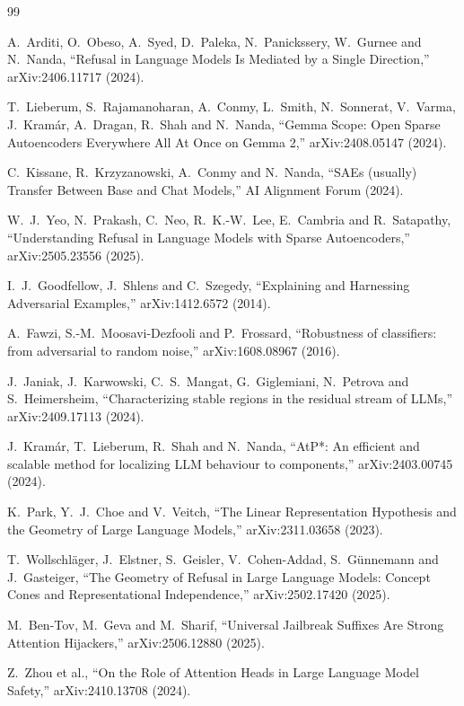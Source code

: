 \documentclass[11pt]{article}
\begin{document}
\begin{thebibliography}{99}

A.~Arditi, O.~Obeso, A.~Syed, D.~Paleka, N.~Panickssery, W.~Gurnee and N.~Nanda,
``Refusal in Language Models Is Mediated by a Single Direction,''
arXiv:2406.11717 (2024).

T.~Lieberum, S.~Rajamanoharan, A.~Conmy, L.~Smith, N.~Sonnerat, V.~Varma, J.~Kram\'ar, A.~Dragan, R.~Shah and N.~Nanda,
``Gemma Scope: Open Sparse Autoencoders Everywhere All At Once on Gemma 2,''
arXiv:2408.05147 (2024).

C.~Kissane, R.~Krzyzanowski, A.~Conmy and N.~Nanda,
``SAEs (usually) Transfer Between Base and Chat Models,''
AI Alignment Forum (2024).

W.~J.~Yeo, N.~Prakash, C.~Neo, R.~K.-W.~Lee, E.~Cambria and R.~Satapathy,
``Understanding Refusal in Language Models with Sparse Autoencoders,''
arXiv:2505.23556 (2025).

I.~J.~Goodfellow, J.~Shlens and C.~Szegedy,
``Explaining and Harnessing Adversarial Examples,''
arXiv:1412.6572 (2014).

A.~Fawzi, S.-M.~Moosavi-Dezfooli and P.~Frossard,
``Robustness of classifiers: from adversarial to random noise,''
arXiv:1608.08967 (2016).

J.~Janiak, J.~Karwowski, C.~S.~Mangat, G.~Giglemiani, N.~Petrova and S.~Heimersheim,
``Characterizing stable regions in the residual stream of LLMs,''
arXiv:2409.17113 (2024).

J.~Kram\'ar, T.~Lieberum, R.~Shah and N.~Nanda,
``AtP*: An efficient and scalable method for localizing LLM behaviour to components,''
arXiv:2403.00745 (2024).

K.~Park, Y.~J.~Choe and V.~Veitch,
``The Linear Representation Hypothesis and the Geometry of Large Language Models,''
arXiv:2311.03658 (2023).

T.~Wollschl\"ager, J.~Elstner, S.~Geisler, V.~Cohen-Addad, S.~G\"unnemann and J.~Gasteiger,
``The Geometry of Refusal in Large Language Models: Concept Cones and Representational Independence,''
arXiv:2502.17420 (2025).

M.~Ben-Tov, M.~Geva and M.~Sharif,
``Universal Jailbreak Suffixes Are Strong Attention Hijackers,''
arXiv:2506.12880 (2025).

Z.~Zhou et al.,
``On the Role of Attention Heads in Large Language Model Safety,''
arXiv:2410.13708 (2024).


\end{thebibliography}
\end{document}
